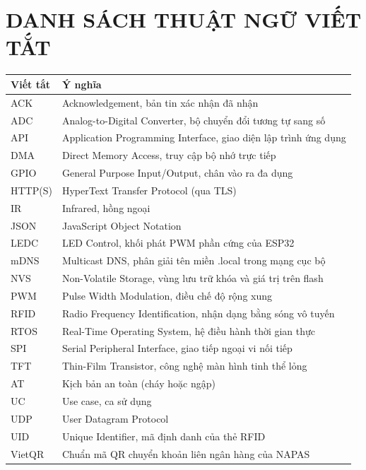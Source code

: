 \documentclass[12pt,letterpaper]{report}
\newcommand{\codeus}{\textunderscore\allowbreak}
\newcommand{\code}[1]{{\ttfamily\let\_\codeus #1}}
\begin{document}
\chapter*{DANH SÁCH THUẬT NGỮ VIẾT TẮT}
\begin{longtable}{|>{\raggedright\arraybackslash}m{2.4cm}|>{\raggedright\arraybackslash}m{11.8cm}|}
\hline
Viết tắt & Ý nghĩa \\ \hline
ACK & Acknowledgement, bản tin xác nhận đã nhận \\ \hline
ADC & Analog-to-Digital Converter, bộ chuyển đổi tương tự sang số \\ \hline
API & Application Programming Interface, giao diện lập trình ứng dụng \\ \hline
DMA & Direct Memory Access, truy cập bộ nhớ trực tiếp \\ \hline
GPIO & General Purpose Input/Output, chân vào ra đa dụng \\ \hline
HTTP(S) & HyperText Transfer Protocol (qua TLS) \\ \hline
IR & Infrared, hồng ngoại \\ \hline
JSON & JavaScript Object Notation \\ \hline
LEDC & LED Control, khối phát PWM phần cứng của ESP32 \\ \hline
mDNS & Multicast DNS, phân giải tên miền \code{.local} trong mạng cục bộ \\ \hline
NVS & Non-Volatile Storage, vùng lưu trữ khóa và giá trị trên flash \\ \hline
PWM & Pulse Width Modulation, điều chế độ rộng xung \\ \hline
RFID & Radio Frequency Identification, nhận dạng bằng sóng vô tuyến \\ \hline
RTOS & Real-Time Operating System, hệ điều hành thời gian thực \\ \hline
SPI & Serial Peripheral Interface, giao tiếp ngoại vi nối tiếp \\ \hline
TFT & Thin-Film Transistor, công nghệ màn hình tinh thể lỏng \\ \hline
AT & Kịch bản an toàn (cháy hoặc ngập) \\ \hline
UC & Use case, ca sử dụng \\ \hline
UDP & User Datagram Protocol \\ \hline
UID & Unique Identifier, mã định danh của thẻ RFID \\ \hline
VietQR & Chuẩn mã QR chuyển khoản liên ngân hàng của NAPAS \\
\hline
\end{longtable}
\end{document}
